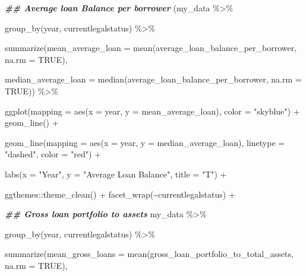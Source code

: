 \documentclass[a4paper,nobind]{templates/ociamthesis}
\newenvironment{Shaded}{\begin{snugshade}}{\end{snugshade}}
\newcommand{\AttributeTok}[1]{\textcolor[rgb]{0.77,0.63,0.00}{#1}}
\newcommand{\ConstantTok}[1]{\textcolor[rgb]{0.00,0.00,0.00}{#1}}
\newcommand{\DocumentationTok}[1]{\textcolor[rgb]{0.56,0.35,0.01}{\textbf{\textit{#1}}}}
\newcommand{\FunctionTok}[1]{\textcolor[rgb]{0.00,0.00,0.00}{#1}}
\newcommand{\NormalTok}[1]{#1}
\newcommand{\SpecialCharTok}[1]{\textcolor[rgb]{0.00,0.00,0.00}{#1}}
\newcommand{\StringTok}[1]{\textcolor[rgb]{0.31,0.60,0.02}{#1}}
\renewenvironment{Shaded}
{
  \vspace{10pt}%
  \begin{snugshade}%
}{%
  \end{snugshade}%
  \vspace{8pt}%
}
\begin{document}
\begin{landscape}
\begin{Shaded}
\begin{Highlighting}[]
\DocumentationTok{\#\# Average loan Balance per borrower}
\NormalTok{(my\_data }\SpecialCharTok{\%\textgreater{}\%} 
  
  \FunctionTok{group\_by}\NormalTok{(year, currentlegalstatus) }\SpecialCharTok{\%\textgreater{}\%} 
  
  \FunctionTok{summarize}\NormalTok{(}\AttributeTok{mean\_average\_loan =} \FunctionTok{mean}\NormalTok{(average\_loan\_balance\_per\_borrower, }\AttributeTok{na.rm =} \ConstantTok{TRUE}\NormalTok{), }
                               
  \AttributeTok{median\_average\_loan =} \FunctionTok{median}\NormalTok{(average\_loan\_balance\_per\_borrower, }\AttributeTok{na.rm =} \ConstantTok{TRUE}\NormalTok{)) }\SpecialCharTok{\%\textgreater{}\%} 
  
  \FunctionTok{ggplot}\NormalTok{(}\AttributeTok{mapping =} \FunctionTok{aes}\NormalTok{(}\AttributeTok{x =}\NormalTok{ year, }\AttributeTok{y =}\NormalTok{ mean\_average\_loan), }\AttributeTok{color =} \StringTok{"skyblue"}\NormalTok{) }\SpecialCharTok{+} \FunctionTok{geom\_line}\NormalTok{() }\SpecialCharTok{+}
  
  \FunctionTok{geom\_line}\NormalTok{(}\AttributeTok{mapping =} \FunctionTok{aes}\NormalTok{(}\AttributeTok{x =}\NormalTok{ year, }\AttributeTok{y =}\NormalTok{ median\_average\_loan), }\AttributeTok{linetype =} \StringTok{"dashed"}\NormalTok{, }\AttributeTok{color =} \StringTok{"red"}\NormalTok{) }\SpecialCharTok{+}
  
  \FunctionTok{labs}\NormalTok{(}\AttributeTok{x =} \StringTok{"Year"}\NormalTok{, }\AttributeTok{y =} \StringTok{"Average Loan Balance"}\NormalTok{, }\AttributeTok{title =} \StringTok{"T"}\NormalTok{) }\SpecialCharTok{+} 
  
\NormalTok{  ggthemes}\SpecialCharTok{::}\FunctionTok{theme\_clean}\NormalTok{() }\SpecialCharTok{+} \FunctionTok{facet\_wrap}\NormalTok{(}\SpecialCharTok{\textasciitilde{}}\NormalTok{currentlegalstatus) }\SpecialCharTok{+}


\DocumentationTok{\#\# Gross loan portfolio to assets }
\NormalTok{my\_data }\SpecialCharTok{\%\textgreater{}\%} 
  
  \FunctionTok{group\_by}\NormalTok{(year, currentlegalstatus) }\SpecialCharTok{\%\textgreater{}\%} 
  
  \FunctionTok{summarize}\NormalTok{(}\AttributeTok{mean\_gross\_loans =} \FunctionTok{mean}\NormalTok{(gross\_loan\_portfolio\_to\_total\_assets, }\AttributeTok{na.rm =} \ConstantTok{TRUE}\NormalTok{), }
                               

\end{Highlighting}
\end{Shaded}
\end{landscape}
\end{document}
